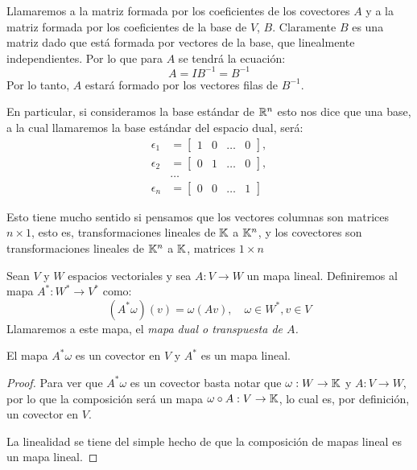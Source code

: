 \begin{example}
  Llamaremos a la matriz formada por los coeficientes de los covectores $A$ y a la matriz formada por los coeficientes de la base de $V$, $B$. Claramente $B$ es una matriz dado que está formada por vectores de la base, que linealmente independientes. Por lo que para $A$ se tendrá la ecuación:
  \[
    A = IB^{-1} = B^{-1}
  \]
  Por lo tanto, $A$ estará formado por los vectores filas de $B^{-1}$.

  En particular, si consideramos la base estándar de $\mathbb{R}^n$ esto nos dice que una base, a la cual llamaremos la base estándar del espacio dual, será:
\begin{align*}
  \epsilon_1 &= \begin{bmatrix} 1 & 0 & \dots & 0\end{bmatrix},\\
  \epsilon_2 &= \begin{bmatrix} 0 & 1 & \dots & 0\end{bmatrix},\\
             &\hdots \\
  \epsilon_n &= \begin{bmatrix} 0 & 0 & \dots & 1\end{bmatrix}
\end{align*}

Esto tiene mucho sentido si pensamos que los vectores columnas son matrices $n \times 1$, esto es, transformaciones lineales de $\mathbb{K}$ a $\mathbb{K}^n$, y los covectores son transformaciones lineales de $\mathbb{K}^n$ a $\mathbb{K}$, matrices $1 \times n$
\end{example}

\begin{definition}
  Sean $V$ y $W$ espacios vectoriales y sea $A: V \to W$ un mapa lineal. Definiremos al mapa $A^*: W^* \to V^*$ como:
  \[
    (A^{*}\omega)(v) = \omega(Av), \quad \omega \in W^{*}, v \in V
  \]  
  Llamaremos a este mapa, el \it{mapa dual} o \it{transpuesta de $A$}.
\end{definition}

\begin{lemma}
  El mapa $A^{*}\omega$ es un covector en $V$ y $A^{*}$ es un mapa lineal.
\end{lemma}

\begin{proof}
  Para ver que $A^{*}\omega$ es un covector basta notar que $\omega: W \to \mathbb{K}$ y $A: V \to W$, por lo que la composición será un mapa $\omega \circ A: V \to \mathbb{K}$, lo cual es, por definición, un covector en $V$.

  La linealidad se tiene del simple hecho de que la composición de mapas lineal es un mapa lineal.
\end{proof}

